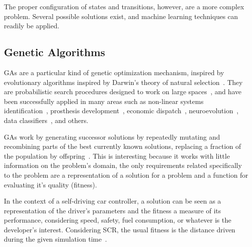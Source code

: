 The proper configuration of states and transitions, however, are a more complex problem. Several possible solutions exist, and machine learning techniques can readily be applied.

\subsection{Genetic Algorithms}

GAs are a particular kind of genetic optimization mechanism, inspired by evolutionary algorithms inspired by Darwin's theory of natural selection~\cite{GA}. They are probabilistic search procedures designed to work on large spaces~\cite{goldberg1988}, and have been successfully applied in many areas such as non-linear systems identification~\cite{GACTRL}, prosthesis development~\cite{GABIO}, economic dispatch~\cite{GAECO}, neuroevolution~\cite{stanley_real-time_2005}, data classifiers~\cite{pedrycz_genetic_2005}, and others.

GAs work by generating successor solutions by repeatedly mutating and recombining parts of the best currently known solutions, replacing a fraction of the population by offspring~\cite{mitchell_1997}. This is interesting because it works with little information on the problem's domain, the only requirements related specifically to the problem are a representation of a solution for a problem and a function for evaluating it's quality (fitness).

In the context of a self-driving car controller, a solution can be seen as a representation of the driver's parameters and the fitness a measure of its performance, considering speed, safety, fuel consumption, or whatever is the developer's interest. Considering SCR, the usual fitness is the distance driven during the given simulation time~\cite{2009}.
